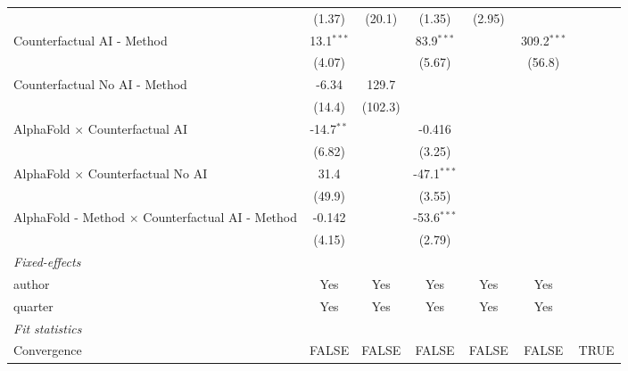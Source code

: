 \begin{tabular}{lcccccc}
                                                           & (1.37)       & (20.1)       & (1.35)        & (2.95)       &               &   \\   
   Counterfactual AI - Method                              & 13.1$^{***}$ &              & 83.9$^{***}$  &              & 309.2$^{***}$ &   \\   
                                                           & (4.07)       &              & (5.67)        &              & (56.8)        &   \\   
   Counterfactual No AI - Method                           & -6.34        & 129.7        &               &              &               &   \\   
                                                           & (14.4)       & (102.3)      &               &              &               &   \\   
   AlphaFold $\times$ Counterfactual AI                    & -14.7$^{**}$ &              & -0.416        &              &               &   \\   
                                                           & (6.82)       &              & (3.25)        &              &               &   \\   
   AlphaFold $\times$ Counterfactual No AI                 & 31.4         &              & -47.1$^{***}$ &              &               &   \\   
                                                           & (49.9)       &              & (3.55)        &              &               &   \\   
   AlphaFold - Method $\times$ Counterfactual AI - Method  & -0.142       &              & -53.6$^{***}$ &              &               &   \\   
                                                           & (4.15)       &              & (2.79)        &              &               &   \\   
   \midrule
   \emph{Fixed-effects}\\
   author                                                  & Yes          & Yes          & Yes           & Yes          & Yes           & \\  
   quarter                                                 & Yes          & Yes          & Yes           & Yes          & Yes           & \\  
   \midrule
   \emph{Fit statistics}\\
   Convergence                                             &FALSE         & FALSE        & FALSE         & FALSE        & FALSE         & TRUE\\  

\end{tabular}
